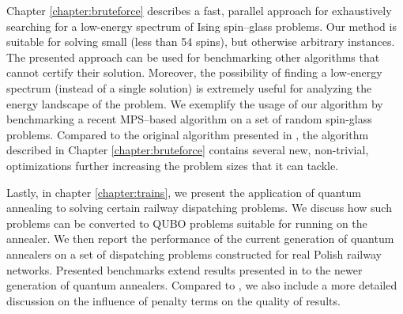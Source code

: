 Chapter \ref{chapter:bruteforce} describes a fast, parallel approach for exhaustively searching for
a low-energy spectrum of Ising spin--glass problems. Our method is suitable for solving small (less
than 54 spins), but otherwise arbitrary instances. The presented approach can be used for
benchmarking other algorithms that cannot certify their solution. Moreover, the possibility of finding
a low-energy spectrum (instead of a single solution) is extremely useful for analyzing the energy
landscape of the problem. We exemplify the usage of our algorithm by benchmarking a recent MPS--based
algorithm on a set of random spin-glass problems. Compared to the original algorithm presented in
\cite{bruteforce}, the algorithm described in Chapter \ref{chapter:bruteforce} contains several
new, non-trivial, optimizations further increasing the problem sizes that it can tackle.

Lastly, in chapter \ref{chapter:trains}, we present the application of quantum annealing to solving
certain railway dispatching problems. We discuss how such problems can be converted
to QUBO problems suitable for running on the annealer. We then report the performance of the current generation
of quantum annealers on a set of dispatching problems constructed for real Polish railway networks.
Presented benchmarks extend results presented in \cite{trains} to the newer generation of quantum annealers.
Compared to \cite{trains}, we also include a more detailed discussion on the influence of penalty terms
on the quality of results.
